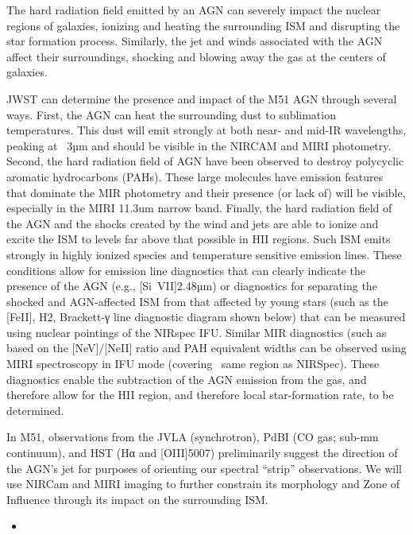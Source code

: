 \documentclass[12pt]{article}
\begin{document}
The hard radiation field emitted by an AGN can severely impact the nuclear regions of galaxies, ionizing and heating the surrounding ISM and disrupting the star formation process. Similarly, the jet and winds associated with the AGN affect their surroundings, shocking and blowing away the gas at the centers of galaxies.

JWST can determine the presence and impact of the M51 AGN through several ways. First, the AGN can heat the surrounding dust to sublimation temperatures. This dust will emit strongly at both near- and mid-IR wavelengths, peaking at ~3µm and should be visible in the NIRCAM and MIRI photometry.  Second, the hard radiation field of AGN have been observed to destroy polycyclic aromatic hydrocarbons (PAHs). These large molecules have emission features that dominate the MIR photometry and their presence (or lack of) will be visible, especially in the MIRI 11.3um narrow band.  Finally, the hard radiation field of the AGN and the shocks created by the wind and jets are able to ionize and excite the ISM to levels far above that possible in HII regions. Such ISM emits strongly in highly ionized species and temperature sensitive emission lines. These conditions allow for emission line diagnostics that can clearly indicate the presence of the AGN (e.g., [Si~VII]2.48µm) or diagnostics for separating the shocked and AGN-affected ISM from that affected by young stars (such as the [FeII], H2, Brackett-γ line diagnostic diagram shown below) that can be measured using nuclear pointings of the NIRspec IFU. Similar MIR diagnostics (such as based on the [NeV]/[NeII] ratio and PAH equivalent widths can be observed using MIRI spectroscopy in IFU mode (covering ~same region as NIRSpec). These diagnostics enable the subtraction of the AGN emission from the gas, and therefore allow for the HII region, and therefore local star-formation rate, to be determined.

In M51, observations from the JVLA (synchrotron), PdBI (CO gas; sub-mm continuum), and HST (Hα and [OIII]5007) preliminarily suggest the direction of the AGN's jet for purposes of orienting our spectral ``strip'' observations.  We will use NIRCam and MIRI imaging to further constrain its morphology and Zone of Influence through its impact on the surrounding ISM. 

\vspace{0.1in}


\begin{itemize}
    \item{}
\end{itemize}
\end{document}
